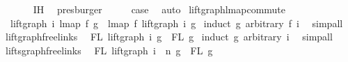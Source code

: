 \begin{isabellebody}
\ \ \ \ \ \isamarkupfalse%
\ IH{}\ \isamarkupfalse%
\ presburger\isanewline
\ \ \isamarkupfalse%
\ \isamarkupfalse%
\ {\isacharquery}{\kern0pt}case\ \isakeywordONE{{\isachardot}{\kern0pt}}\isamarkupfalse%
\isanewline
{}\isamarkupfalse%
\ auto%
\endisatagproof
{\isafoldproof}%
%
\isadelimproof
%
\endisadelimproof
%
\isadelimdocument
%
\endisadelimdocument
%
\isatagdocument
%
\isamarkuptrue%
%
\isamarkuptrue%
%
\endisatagdocument
{\isafolddocument}%
%
\isadelimdocument
%
\endisadelimdocument
{}\isamarkupfalse%
\ lift{\isacharunderscore}{\kern0pt}graph{\isacharunderscore}{\kern0pt}lmap{\isacharunderscore}{\kern0pt}commute{\isacharcolon}{\kern0pt}\isanewline
\ \ {\isachardoublequoteopen}lift{\isacharunderscore}{\kern0pt}graph\ i\ {\isacharparenleft}{\kern0pt}lmap\ f\ g{\isacharparenright}{\kern0pt}\ {\isacharequal}{\kern0pt}\ lmap\ f\ {\isacharparenleft}{\kern0pt}lift{\isacharunderscore}{\kern0pt}graph\ i\ g{\isacharparenright}{\kern0pt}{\isachardoublequoteclose}\isanewline
%
\isadelimproof
%
\endisadelimproof
%
\isatagproof
{}\isamarkupfalse%
\ {\isacharparenleft}{\kern0pt}induct\ g\ arbitrary{\isacharcolon}{\kern0pt}\ f\ i{\isacharparenright}{\kern0pt}\ \isamarkupfalse%
\ simp{\isacharunderscore}{\kern0pt}all%
\endisatagproof
{\isafoldproof}%
%
\isadelimproof
\isanewline
%
\endisadelimproof
\isanewline
\isanewline
{}\isamarkupfalse%
\ lift{\isacharunderscore}{\kern0pt}graph{\isacharunderscore}{\kern0pt}freelinks{\isacharcolon}{\kern0pt}\isanewline
\ \ {\isachardoublequoteopen}FL\ {\isacharparenleft}{\kern0pt}lift{\isacharunderscore}{\kern0pt}graph\ i\ g{\isacharparenright}{\kern0pt}\ {\isacharequal}{\kern0pt}\ FL\ g{\isachardoublequoteclose}\isanewline
%
\isadelimproof
%
\endisadelimproof
%
\isatagproof
{}\isamarkupfalse%
\ {\isacharparenleft}{\kern0pt}induct\ g\ arbitrary{\isacharcolon}{\kern0pt}\ i{\isacharparenright}{\kern0pt}\ \isamarkupfalse%
\ simp{\isacharunderscore}{\kern0pt}all%
\endisatagproof
{\isafoldproof}%
%
\isadelimproof
\isanewline
%
\endisadelimproof
\isanewline
\isanewline
{}\isamarkupfalse%
\ lifts{\isacharunderscore}{\kern0pt}graph{\isacharunderscore}{\kern0pt}freelinks{\isacharcolon}{\kern0pt}\isanewline
\ \ {\isachardoublequoteopen}FL\ {\isacharparenleft}{\kern0pt}{\isacharparenleft}{\kern0pt}lift{\isacharunderscore}{\kern0pt}graph\ i\ {\isacharcircum}{\kern0pt}{\isacharcircum}{\kern0pt}\ n{\isacharparenright}{\kern0pt}\ g{\isacharparenright}{\kern0pt}\ {\isacharequal}{\kern0pt}\ FL\ g{\isachardoublequoteclose}\isanewline

\end{isabellebody}
